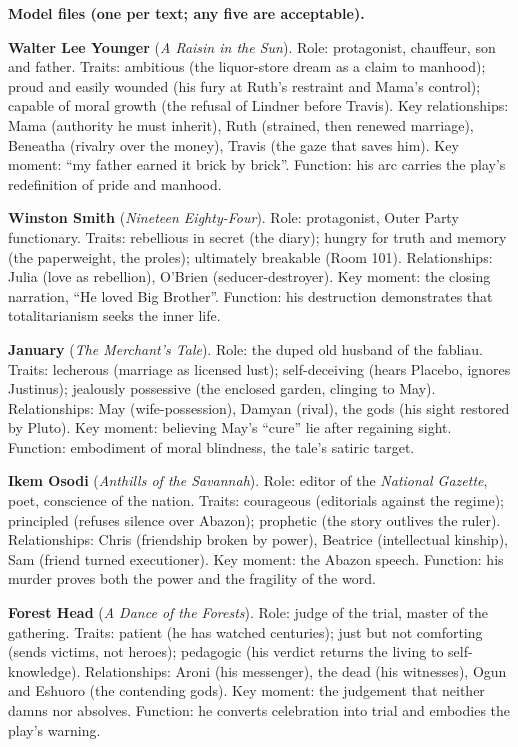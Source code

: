 \documentclass[11pt]{article}
\begin{document}
\begin{corrige}
\textbf{Model files (one per text; any five are acceptable).}

\textbf{Walter Lee Younger} (\emph{A Raisin in the Sun}). Role: protagonist, chauffeur, son and father. Traits: ambitious (the liquor-store dream as a claim to manhood); proud and easily wounded (his fury at Ruth's restraint and Mama's control); capable of moral growth (the refusal of Lindner before Travis). Key relationships: Mama (authority he must inherit), Ruth (strained, then renewed marriage), Beneatha (rivalry over the money), Travis (the gaze that saves him). Key moment: ``my father earned it brick by brick''. Function: his arc carries the play's redefinition of pride and manhood.

\textbf{Winston Smith} (\emph{Nineteen Eighty-Four}). Role: protagonist, Outer Party functionary. Traits: rebellious in secret (the diary); hungry for truth and memory (the paperweight, the proles); ultimately breakable (Room 101). Relationships: Julia (love as rebellion), O'Brien (seducer-destroyer). Key moment: the closing narration, ``He loved Big Brother''. Function: his destruction demonstrates that totalitarianism seeks the inner life.

\textbf{January} (\emph{The Merchant's Tale}). Role: the duped old husband of the fabliau. Traits: lecherous (marriage as licensed lust); self-deceiving (hears Placebo, ignores Justinus); jealously possessive (the enclosed garden, clinging to May). Relationships: May (wife-possession), Damyan (rival), the gods (his sight restored by Pluto). Key moment: believing May's ``cure'' lie after regaining sight. Function: embodiment of moral blindness, the tale's satiric target.

\textbf{Ikem Osodi} (\emph{Anthills of the Savannah}). Role: editor of the \emph{National Gazette}, poet, conscience of the nation. Traits: courageous (editorials against the regime); principled (refuses silence over Abazon); prophetic (the story outlives the ruler). Relationships: Chris (friendship broken by power), Beatrice (intellectual kinship), Sam (friend turned executioner). Key moment: the Abazon speech. Function: his murder proves both the power and the fragility of the word.

\textbf{Forest Head} (\emph{A Dance of the Forests}). Role: judge of the trial, master of the gathering. Traits: patient (he has watched centuries); just but not comforting (sends victims, not heroes); pedagogic (his verdict returns the living to self-knowledge). Relationships: Aroni (his messenger), the dead (his witnesses), Ogun and Eshuoro (the contending gods). Key moment: the judgement that neither damns nor absolves. Function: he converts celebration into trial and embodies the play's warning.


\end{corrige}
\end{document}
